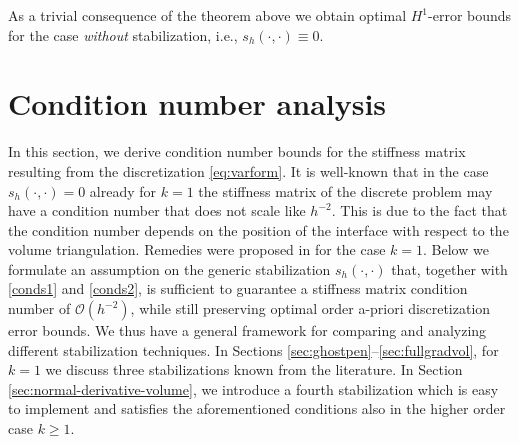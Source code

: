 \documentclass[final]{siamltex}
\begin{document}
\begin{corollary} As a trivial consequence of the theorem above we obtain optimal $H^1$-error bounds for the case \emph{without} stabilization, i.e., $s_h(\cdot,\cdot)\equiv 0$. 
\end{corollary}
\section{Condition number analysis}
\label{sec:condition-number}
In this section, we derive condition number bounds for the stiffness matrix resulting from the discretization \eqref{eq:varform}.
It is well-known that in the case $s_h(\cdot,\cdot)=0$ already for $k=1$ the stiffness matrix of the discrete problem may have a condition number that does not scale like $h^{-2}$. This is due to the fact that the condition number depends on the position of the interface with respect to the volume triangulation. Remedies were proposed in \cite{BHL15,burman16fullgradcmame,reusken2015} for the case $k=1$. Below we formulate an assumption on the generic stabilization $s_h(\cdot,\cdot)$ that, together with \eqref{conds1} and \eqref{conds2}, is sufficient to guarantee a stiffness matrix condition number of $\mathcal{O}(h^{-2})$, while still preserving optimal order a-priori discretization error bounds. We thus have a general framework for comparing and analyzing different stabilization techniques. In Sections \ref{sec:ghostpen}--\ref{sec:fullgradvol}, for $k=1$
we discuss three stabilizations known from the literature. In Section \ref{sec:normal-derivative-volume}, we introduce a fourth stabilization which is easy to implement and satisfies the aforementioned conditions also in the higher order case $k\geq 1$.
\end{document}
